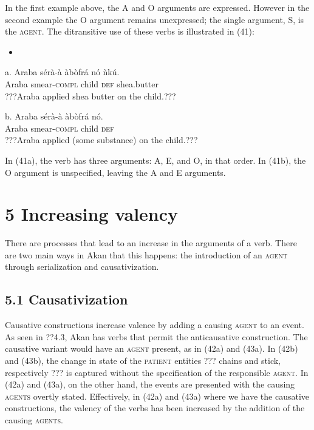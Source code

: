 \documentclass[output=paper]{langsci/langscibook}
\begin{document}
In the first example above, the A and O arguments are expressed. However in the second example the O argument remains unexpressed; the single argument, S, is the \textsc{agent}. The ditransitive use of these verbs is illustrated in (41):

\begin{itemize}
\item \end{itemize}
\gll a.  Araba  s\'{e}r\`{a}-\`{a}    \`{a}b\`{o}fr\'{a}  n\'{o}  \`{n}k\'{u}.\\
       Araba  smear-\textsc{compl}  child  \textsc{def}  shea.butter\\
\glt ???Araba applied shea butter on the child.???
\z

\gll  b.  Araba  s\'{e}r\`{a}-\`{a}    \`{a}b\`{o}fr\'{a}  n\'{o}.\\
       Araba  smear-\textsc{compl}  child  \textsc{def}\\
\glt ???Araba applied (some substance) on the child.???
\z

In (41a), the verb has three arguments: A, E, and O, in that order. In (41b), the O argument is unspecified, leaving the A and E arguments.

\chapter[5  Increasing valency]{5  Increasing valency}

There are processes that lead to an increase in the arguments of a verb. There are two main ways in Akan that this happens: the introduction of an \textsc{agent} through serialization and causativization.

\section{5.1  Causativization}

Causative constructions increase valence by adding a causing \textsc{agent} to an event. As seen in ??4.3, Akan has verbs that permit the anticausative construction. The causative variant would have an \textsc{agent} present, as in (42a) and (43a). In (42b) and (43b), the change in state of the \textsc{patient} entities ??? chains and stick, respectively ??? is captured without the specification of the responsible \textsc{agent}. In (42a) and (43a), on the other hand, the events are presented with the causing \textsc{agents} overtly stated. Effectively, in (42a) and (43a) where we have the causative constructions, the valency of the verbs has been increased by the addition of the causing \textsc{agents}.
\end{document}
